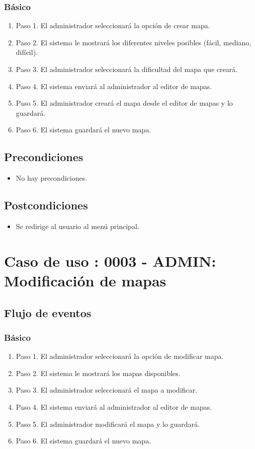 \subsubsection{Básico}

\begin{enumerate}
\item Paso 1.
El administrador seleccionará la opción de crear mapa.
\item Paso 2.
El sistema le mostrará los diferentes niveles posibles (fácil, mediano, difícil).
\item Paso 3.
El administrador seleccionará la dificultad del mapa que creará.
\item Paso 4.
El sistema enviará al administrador al editor de mapas.
\item Paso 5.
El administrador creará el mapa desde el editor de mapas y lo guardará.
\item Paso 6.
El sistema guardará el nuevo mapa.
\end{enumerate}

\subsection{Precondiciones}
\begin{itemize}
\item No hay precondiciones.
\end{itemize}

\subsection{Postcondiciones}
\begin{itemize}
\item Se redirige al usuario al menú principal.
\end{itemize}



\section{Caso de uso : 0003 - ADMIN: Modificación de mapas}\label{sec:uc0}
\subsection{Flujo de eventos}
\subsubsection{Básico}

\begin{enumerate}
\item Paso 1.
El administrador seleccionará la opción de modificar mapa.
\item Paso 2.
El sistema le mostrará los mapas disponibles.
\item Paso 3.
El administrador seleccionará el mapa a modificar.
\item Paso 4.
El sistema enviará al administrador al editor de mapas.
\item Paso 5.
El administrador modificará el mapa y lo guardará.
\item Paso 6.
El sistema guardará el nuevo mapa.
\end{enumerate}

